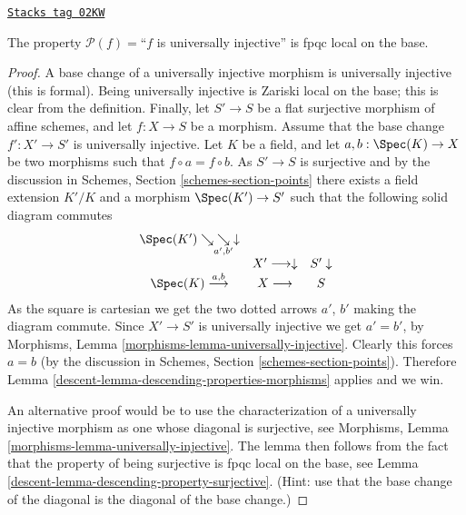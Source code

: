 \begin{lemma}
\label{descent-lemma-descending-property-universally-injective}
\href{https://stacks.math.columbia.edu/tag/02KW}{\texttt{Stacks tag 02KW}}

The property $\mathcal{P}(f) =$``$f$ is universally injective''
is fpqc local on the base.
\end{lemma}

\begin{proof}

A base change of a universally injective morphism is universally
injective (this is formal). Being universally injective is Zariski
local on the base; this is clear from the definition.
Finally, let
$S' \to S$ be a flat surjective morphism of affine schemes,
and let $f : X \to S$ be a morphism. Assume that the base change
$f' : X' \to S'$ is universally injective. Let $K$ be a field, and let
$a, b : \Spec(K) \to X$ be two morphisms such that
$f \circ a = f \circ b$. As $S' \to S$ is surjective and
by the discussion in Schemes,
Section \ref{schemes-section-points} there exists a field
extension $K'/K$ and a morphism $\Spec(K')
\to S'$ such that the following solid diagram commutes
$$
\begin{array}{ccc}\Spec(K') \searrow\underset{a', b'}{\searrow}\downarrow &  &  \\  & X' \longrightarrow\downarrow & S' \downarrow \\ \Spec(K) \overset{a, b}{\longrightarrow} & X \longrightarrow & S\end{array}
$$
As the square is cartesian we get the two dotted arrows $a'$, $b'$ making the
diagram commute. Since $X' \to S'$ is universally injective we get $a' = b'$,
by
Morphisms, Lemma \ref{morphisms-lemma-universally-injective}.
Clearly this forces $a = b$ (by the discussion in Schemes,
Section \ref{schemes-section-points}).
Therefore Lemma \ref{descent-lemma-descending-properties-morphisms} applies and we win.

\medskip\noindent
An alternative proof would be to use the characterization of a universally
injective morphism as one whose diagonal is surjective, see
Morphisms, Lemma \ref{morphisms-lemma-universally-injective}.
The lemma then follows from the fact that
the property of being surjective is fpqc local on the base, see
Lemma \ref{descent-lemma-descending-property-surjective}.
(Hint: use that the base change of the diagonal is the diagonal
of the base change.)
\end{proof}

